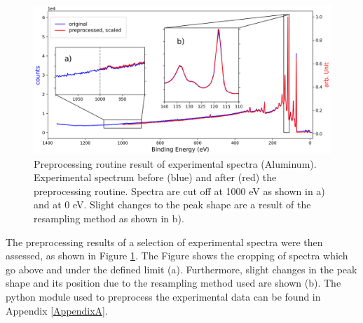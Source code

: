 \begin{figure}
    \centering
    \includegraphics[width=\textwidth]{Figures/preprocessing_routine.png}
    \caption{Preprocessing routine result of experimental spectra (Aluminum). Experimental spectrum before (blue) and after (red) the preprocessing routine. Spectra are cut off at 1000 eV as shown in a) and at 0 eV. Slight changes to the peak shape are a result of the resampling method as shown in b).}
    \label{fig:preproc_routine}
\end{figure}

The preprocessing results of a selection of experimental spectra were then assessed, as shown in Figure \ref{fig:preproc_routine}. The Figure shows the cropping of spectra which go above and under the defined limit (a). Furthermore, slight changes in the peak shape and its position due to the resampling method used are shown (b). The python module used to preprocess the experimental data can be found in Appendix \ref{AppendixA}.


